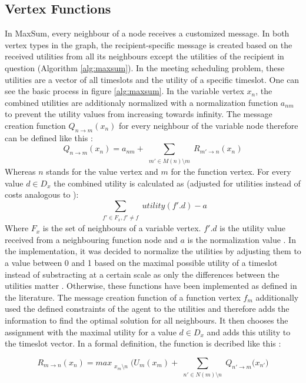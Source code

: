 \subsection{Vertex Functions} 
In MaxSum, every neighbour of a node receives a customized message. In both vertex types in the graph, the recipient-specific message is created based on the received utilities from all its neighbours except the utilities of the recipient in question (Algorithm \ref{alg:maxsum}). In the meeting scheduling problem, these utilities are a vector of all timeslots and the utility of a specific timeslot. One can see the basic process in figure \ref{alg:maxsum}.
In the variable vertex \(x_{n}\), the combined utilities are additionaly normalized with a normalization function \(a_{nm}\) to prevent the utility values from increasing towards infinity. The message creation function \(Q_{n \rightarrow m}(x_{n})\) for every neighbour of the variable node therefore can be defined like this \cite{Farinelli2008}:
\[Q_{n \rightarrow  m}(x_{n}) = a_{nm} + \sum_{\substack{m' \in M (n) \setminus  m }} R_{m' \rightarrow n} (x_{n}) \]
Whereas \(n\) stands for the value vertex and \(m\) for the function vertex. For every value \(d \in D_{x}\) the combined utility is calculated as (adjusted for utilities instead of costs analogous to \cite{Zivan2012}):
\[\sum_{\substack{f' \in F_{x}, f' \neq f}}  utility(f'.d ) -a \]
Where \(F_{x}\) is the set of neighbours of a variable vertex. \(f'.d\) is the utility value received from a neighbouring function node and \(a\) is the normalization value . In the implementation, it was decided to normalize the utilities by adjusting them to a value between 0 and 1 based on the maximal possible utility of a timeslot instead of substracting at a certain scale as only the differences between the utilities matter \cite{Zivan2012}. Otherwise, these functions have been implemented as defined in the literature.
The message creation function of a function vertex \(f_{m}\) additionally used the defined constraints of the agent to the utilities and therefore adds the information to find the optimal solution for all neighbours. It then chooses the assignment with the maximal utility for a value \(d \in D_{x}\) and adds this utility to the timeslot vector. In a formal definition, the function is decribed like this \cite{Farinelli2008}: 

\[R_{m \rightarrow  n}(x_{n}) = max_{\substack{x_{m} \setminus n}} \bigg( U_{m}(x_{m}) + \sum_{\substack{n' \in N (m) \setminus n }} Q_{n' \rightarrow m} (x_{n'} \bigg) \]

